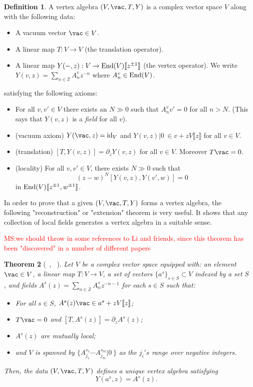 \documentclass[12pt]{amsart}
\newtheorem{theorem}{Theorem}[section]
\theoremstyle{definition}
\newtheorem{dfn}[theorem]{Definition}
\theoremstyle{remark}
\def\matt{\textcolor{red}{MS:}\textcolor{red}}
\begin{document}
\begin{dfn}
A vertex algebra $(V,\vac, T, Y)$ is a complex vector
space $V$ along with the following data:
\begin{itemize}
\item A vacuum vector $\vac \in V$.
\item A linear map $T : V \to V$ (the translation operator).
\item A linear map $Y(-,z) : V \to {\rm End}(V)\llbracket z^{\pm 1}
  \rrbracket$ (the vertex operator). We write $Y(v,z) = \sum_{n \in \mathbb{Z}} A_n^v z^{-n}$
  where $A_n^v \in {\rm End}(V)$. 
\end{itemize} 
satisfying the following axioms:
\begin{itemize}
\item For all $v,v' \in V$ there exists an $N \gg 0$ such that $A_n^v
  v' = 0$ for all $n > N$. (This says that $Y(v,z)$ is a {\it field}
  for all $v$). 
\item (vacuum axiom) $Y(\vac, z) = {\rm id}_V$ and
    $Y(v,z)  |0\> \in v + z V \llbracket z \rrbracket$ for all
    $v \in V$. 
\item (translation) $[T,Y(v,z)] = \partial_z Y(v,z)$ for all $v \in
  V$. Moreover $T \vac = 0$. 
\item (locality) For all $v,v' \in V$, there exists $N \gg 0$ such
  that 
\[
(z-w)^N[Y(v,z),Y(v',w)] = 0
\]
in ${\rm End}(V) \llbracket z^{\pm 1},w^{\pm 1}\rrbracket$. 
\end{itemize}
\end{dfn}


In order to prove that a given $(V,\vac,T,Y)$ forms a vertex algebra, the following "reconstruction" or "extension" theorem is very useful. It shows that any collection of local fields generates a vertex algebra in a suitable sense. 

\matt{we should throw in some references to Li and friends, since this theorem has been "discovered" in a number of different papers}

\begin{theorem}[~\cite{FBZ}, ~\cite{DSK}] \label{rec_thm} Let $V$ be a complex vector space equipped with: an
  element $\vac \in V$, a linear map $T : V \to V$, a 
    set of vectors $\{a^s\}_{s \in S} \subset V$ indexed by a set $S$, and fields $A^s(z) =
    \sum_{n \in \mathbb{Z}} A_n^sz^{-n-1}$ for each $s\in S$ such that:
\begin{itemize}
\item For all $s \in S$, $A^s(z) \vac \in a^s + z V\llbracket
    z\rrbracket$;
\item $T \vac = 0$ and $[T,A^s(z)] = \partial_z A^s(z)$;
\item $A^s(z)$ are mutually local;
\item and $V$ is spanned by $\{A_{j_1}^{s_1} \cdots A_{j_m}^{s_m}
  |0\>\}$ as the $j_i's$ range over negative integers. 
\end{itemize}
Then, the data $(V,\vac, T,Y)$ defines a unique vertex algebra satisfying 
\[
Y(a^s,z) = A^s(z) .
\]
\end{theorem}
\end{document}

